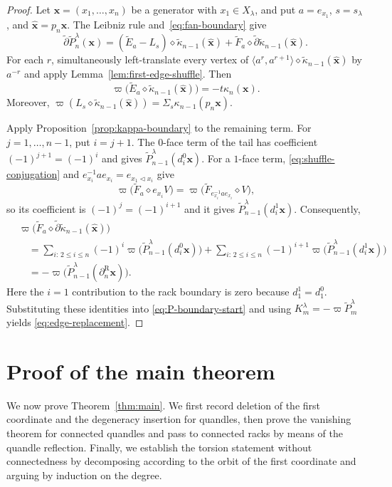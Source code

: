 \documentclass[10pt,a4paper]{amsart}
\newcommand{\tkap}{\widetilde\kappa}
\newcommand{\tF}{\widetilde F}
\newcommand{\tE}{\widetilde E}
\newcommand{\tP}{\widetilde P}
\newcommand{\td}{\widetilde\partial}
\newcommand{\R}{\mathrm R}
\begin{document}
\begin{proof}
Let $\mathbf x=(x_1,\ldots,x_n)$ be a generator with $x_1\in X_\lambda$, and put $a=e_{x_1}$, $s=s_\lambda$, and $\widehat{\mathbf x}=p_n\mathbf x$. The Leibniz rule and~\eqref{eq:fan-boundary} give
\begin{equation}
 \td\tP_n^\lambda(\mathbf x)
 =(\tE_a-L_s)\diamond\tkap_{n-1}(\widehat{\mathbf x})
 +\tF_a\diamond\td\tkap_{n-1}(\widehat{\mathbf x}).
 \label{eq:P-boundary-start}
\end{equation}
For each $r$, simultaneously left-translate every vertex of
$\langle a^r,a^{r+1}\rangle\diamond
\tkap_{n-1}(\widehat{\mathbf x})$ by $a^{-r}$ and apply
Lemma~\ref{lem:first-edge-shuffle}. Then
\[
 \varpi\bigl(\tE_a\diamond\tkap_{n-1}(\widehat{\mathbf x})\bigr)
 =-t\kappa_n(\mathbf x).
\]
Moreover,
$\varpi(L_s\diamond\tkap_{n-1}(\widehat{\mathbf x}))=\Sigma_s\kappa_{n-1}(p_n\mathbf x)$.

Apply Proposition~\ref{prop:kappa-boundary} to the remaining term.
For $j=1,\ldots,n-1$, put $i=j+1$. The $0$-face term of the
tail has coefficient $(-1)^{j+1}=(-1)^i$ and gives
$\tP_{n-1}^\lambda(d_i^0\mathbf x)$. For a $1$-face term,
\eqref{eq:shuffle-conjugation} and
$e_{x_i}^{-1}ae_{x_i}=e_{x_1\lhd x_i}$ give
\[
\varpi\bigl(\tF_a\diamond e_{x_i}V\bigr)
=
\varpi\bigl(\tF_{e_{x_i}^{-1}ae_{x_i}}\diamond V\bigr),
\]
so its coefficient is $(-1)^j=(-1)^{i+1}$ and it gives
$\tP_{n-1}^\lambda(d_i^1\mathbf x)$. Consequently,
\begin{align*}
&\varpi\bigl(
\tF_a\diamond\td\tkap_{n-1}(\widehat{\mathbf x})
\bigr)\\
&\quad=
\sum_{i:\,2\le i\le n}(-1)^i
\varpi\bigl(\tP_{n-1}^\lambda(d_i^0\mathbf x)\bigr)
+
\sum_{i:\,2\le i\le n}(-1)^{i+1}
\varpi\bigl(\tP_{n-1}^\lambda(d_i^1\mathbf x)\bigr)\\
&\quad=
-\varpi\bigl(
\tP_{n-1}^\lambda(\partial_n^\R\mathbf x)
\bigr).
\end{align*}
Here the $i=1$ contribution to the rack boundary is zero because
$d_1^1=d_1^0$. Substituting these identities into
\eqref{eq:P-boundary-start} and using
$K_m^\lambda=-\varpi\tP_m^\lambda$ yields
\eqref{eq:edge-replacement}.
\end{proof}

\section{Proof of the main theorem}

We now prove Theorem~\ref{thm:main}. We first record deletion of the first coordinate and the degeneracy insertion for quandles, then prove the vanishing theorem for connected quandles and pass to connected racks by means of the quandle reflection. Finally, we establish the torsion statement without connectedness by decomposing according to the orbit of the first coordinate and arguing by induction on the degree.
\end{document}
